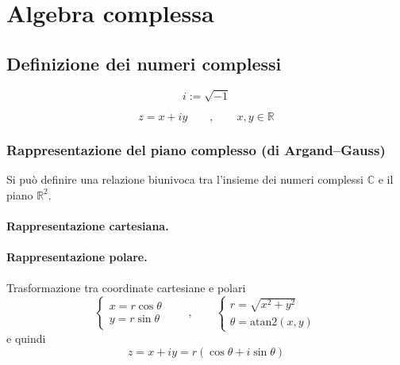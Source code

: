 
\chapter{Algebra complessa}\label{ch:complex-algebra}
\section{Definizione dei numeri complessi}
\begin{definition} 
 \begin{equation}
   i := \sqrt{-1}
 \end{equation}
\end{definition}

\begin{definition}
\begin{equation}
  z = x + i y \qquad , \qquad x,y \in \mathbb{R}
\end{equation}
\end{definition}


\subsection{Rappresentazione del piano complesso (di Argand--Gauss)}
Si può definire una relazione biunivoca tra l'insieme dei numeri complessi $\mathbb{C}$ e il piano $\mathbb{R}^2$.

\subsubsection{Rappresentazione cartesiana.}

\subsubsection{Rappresentazione polare.}
Trasformazione tra coordinate cartesiane e polari
\begin{equation}
\begin{cases}
  x = r \cos \theta \\
  y = r \sin \theta
\end{cases} \qquad , \qquad
\begin{cases}
  r = \sqrt{x^2 + y^2} \\
  \theta = \text{atan2}(x,y)
\end{cases}
\end{equation}
e quindi
\begin{equation}
  z = x + i y = r \left( \cos \theta + i \sin \theta \right)
\end{equation}

